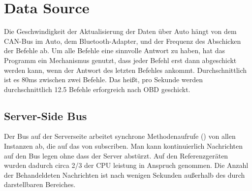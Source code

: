 \documentclass[qualitaetssicherung.tex]{subfiles}
\begin{document}
\section{Data Source}
Die Geschwindigkeit der Aktualisierung der Daten über Auto hängt von dem CAN-Bus
im Auto, dem Bluetooth-Adapter, und der Frequenz des Abschicken der Befehle ab.
Um alle Befehle eine sinnvolle Antwort zu haben, hat das Programm ein
Mechanismus genutzt, dass jeder Befehl erst dann abgeschickt werden kann, wenn der
Antwort des letzten Befehles ankommt. Durchschnittlich ist es 80ms zwischen zwei
Befehle. Das heißt, pro Sekunde werden durchschnittlich 12.5 Befehle erforgreich
nach OBD geschickt.

\subsection{Server-Side Bus}
	Der Bus auf der Serverseite arbeitet synchrone Methodenaufrufe () von allen  Instanzen ab, die auf das  von  subscriben. Man kann kontinuierlich Nachrichten auf den Bus legen ohne dass der Server abstürzt. Auf den Referenzgeräten wurden dadurch circa 2/3 der CPU leistung in Anspruch genommen. Die Anzahl der Behandeldeten Nachrichten ist nach wenigen Sekunden außerhalb des durch  darstellbaren Bereiches.
\end{document}
